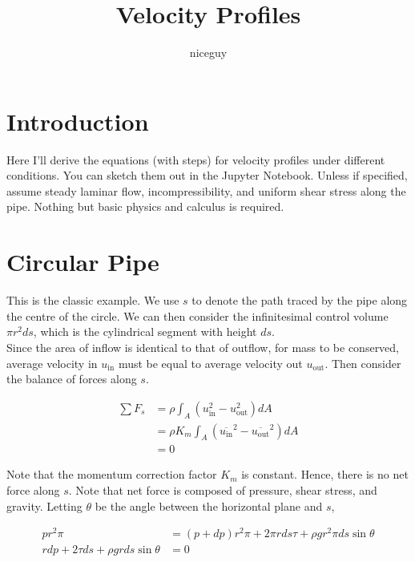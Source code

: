 \documentclass[12pt]{article}
\title{Velocity Profiles}
\author{niceguy}
\begin{document}
\maketitle

\section{Introduction}

Here I'll derive the equations (with steps) for velocity profiles under different conditions. You can sketch them out in the Jupyter Notebook. Unless if specified, assume steady laminar flow, incompressibility, and uniform shear stress along the pipe. Nothing but basic physics and calculus is required.


\section{Circular Pipe}

This is the classic example. We use $s$ to denote the path traced by the pipe along the centre of the circle. We can then consider the infinitesimal control volume $\pi r^2ds$, which is the cylindrical segment with height $ds$. \\

Since the area of inflow is identical to that of outflow, for mass to be conserved, average velocity in $u_{\text{in}}$ must be equal to average velocity out $u_{\text{out}}$. Then consider the balance of forces along $s$.

\begin{align*}
    \sum F_s &= \rho \int_A \left(u_{\text{in}}^2 - u_{\text{out}}^2\right) dA \\
             &= \rho K_m \int_A \left(\overline{u_{\text{in}}}^2 - \overline{u_{\text{out}}}^2\right) dA \\
             &= 0
\end{align*}

Note that the momentum correction factor $K_m$ is constant. Hence, there is no net force along $s$. Note that net force is composed of pressure, shear stress, and gravity. Letting $\theta$ be the angle between the horizontal plane and $s$,

\begin{align*}
    pr^2\pi &= (p+dp)r^2\pi + 2\pi rds\tau + \rho gr^2\pi ds\sin\theta \\
    rdp + 2\tau ds + \rho g rds\sin\theta &= 0 \\
\end{align*}
\end{document}
